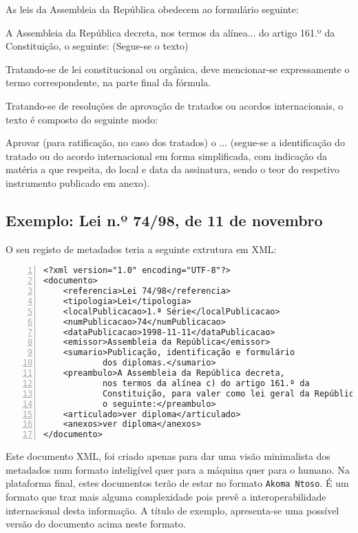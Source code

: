 As leis da Assembleia da República obedecem ao formulário seguinte:
\begin{quoting}
A Assembleia da República decreta, nos termos da alínea... do artigo 161.º da Constituição, o seguinte:
(Segue-se o texto)
\end{quoting}

Tratando-se de lei constitucional ou orgânica, deve mencionar-se expressamente o termo correspondente, 
na parte final da fórmula. 

Tratando-se de resoluções de aprovação de tratados ou acordos internacionais, o texto é composto do seguinte modo:
\begin{quoting}
Aprovar (para ratificação, no caso dos tratados) o ... 
(segue-se a identificação do tratado ou do acordo internacional em forma simplificada, 
com indicação da matéria a que respeita, do local e data da assinatura, sendo o teor do respetivo 
instrumento publicado em anexo).
\end{quoting}

\subsection{Exemplo: Lei n.º 74/98, de 11 de novembro} 

O seu registo de metadados teria a seguinte extrutura em XML:

\begin{Verbatim}[frame=single, numbers=left, fontsize=\small, commandchars=\\\{\}]
<?xml version="1.0" encoding="UTF-8"?>
<documento>
    <referencia>Lei 74/98</referencia>
    <tipologia>Lei</tipologia>
    <localPublicacao>1.ª Série</localPublicacao>
    <numPublicacao>74</numPublicacao>
    <dataPublicacao>1998-11-11</dataPublicacao>
    <emissor>Assembleia da República</emissor>
    <sumario>Publicação, identificação e formulário 
            dos diplomas.</sumario>
    <preambulo>A Assembleia da República decreta, 
            nos termos da alínea c) do artigo 161.º da 
            Constituição, para valer como lei geral da República, 
            o seguinte:</preambulo>
    <articulado>ver diploma</articulado>
    <anexos>ver diploma</anexos>
</documento>
\end{Verbatim}

Este documento XML, foi criado apenas para dar uma visão minimalista dos metadados num formato inteligível quer 
para a máquina quer para o humano. Na plataforma final, estes documentos terão de estar no formato \texttt{Akoma Ntoso}.
É um formato que traz mais alguma complexidade pois prevê a interoperabilidade internacional desta informação.
A título de exemplo, apresenta-se uma possível versão do documento acima neste formato.

